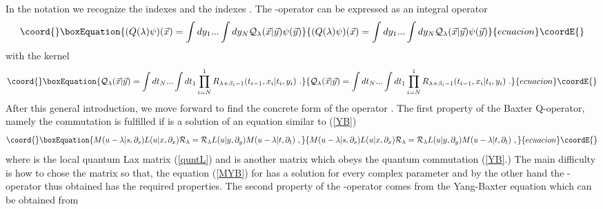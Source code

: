 \documentclass[a4paper,11pt]{article}
\begin{document}
In the notation \coordHE{} we recognize the \coordHE{}
indexes \coordHE{} and the \coordHE{} indexes \coordHE{}. The \coordHE{}-operator can be
expressed as an integral operator
\begin{equation}\coord{}\boxEquation{
\label{intQ}
(Q(\lambda ) \psi)({\vec x})
     =\int dy_1...\int dy_N {\cal Q}_\lambda ({\vec x}|{\vec y})\psi ({\vec y})
}{
(Q(\lambda ) \psi)({\vec x})
     =\int dy_1...\int dy_N {\cal Q}_\lambda ({\vec x}|{\vec y})\psi ({\vec y})
}{ecuacion}\coordE{}\end{equation}
with the kernel
\begin{equation}\coord{}\boxEquation{
\label{K}
{\cal Q}_\lambda ({\vec x}|{\vec y})=\int dt_N...\int dt_1 \prod_{i=N}^1
    R_{\lambda +\beta_i-1}(t_{i-1},x_i|t_i,y_i) ~.
}{
{\cal Q}_\lambda ({\vec x}|{\vec y})=\int dt_N...\int dt_1 \prod_{i=N}^1
    R_{\lambda +\beta_i-1}(t_{i-1},x_i|t_i,y_i) ~.
}{ecuacion}\coordE{}\end{equation}
After this general introduction, we move forward to find the concrete form
of the operator \coordHE{}. The first property of the Baxter
Q-operator, namely the commutation \coordHE{} is fulfilled
if \coordHE{} is a solution of an equation similar to (\ref{YB})
\begin{equation}\coord{}\boxEquation{
\label{MYB}
M(u-\lambda |s,\partial_s) L(u|x,\partial_x){\cal R}_\lambda={\cal R}_\lambda
L(u|y,\partial_y)M(u-\lambda |t,\partial_t) ~,
}{
M(u-\lambda |s,\partial_s) L(u|x,\partial_x){\cal R}_\lambda={\cal R}_\lambda
L(u|y,\partial_y)M(u-\lambda |t,\partial_t) ~,
}{ecuacion}\coordE{}\end{equation}
where \coordHE{} is the local quantum Lax matrix (\ref{quntL}) and
\coordHE{} is another matrix which obeys the quantum commutation
(\ref{YB}.) The main difficulty is how to chose the matrix \coordHE{} so
that, the equation (\ref{MYB}) for \coordHE{} has a solution for
every complex parameter \coordHE{} and by the other hand the \coordHE{}-operator thus
obtained has the required properties. The second property of the
\coordHE{}-operator comes from the Yang-Baxter equation which can be obtained from
\end{document}

